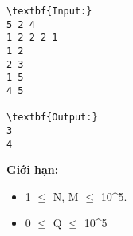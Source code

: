 \begin{verbatim}
\textbf{Input:}
5 2 4
1 2 2 2 1
1 2
2 3
1 5
4 5

\textbf{Output:}
3
4\end{verbatim}


\textbf{Giới hạn:} 
\begin{itemize}
	\item 1  $\le$  N, M  $\le$  10^5.
	\item 0  $\le$  Q  $\le$  10^5
\end{itemize}
